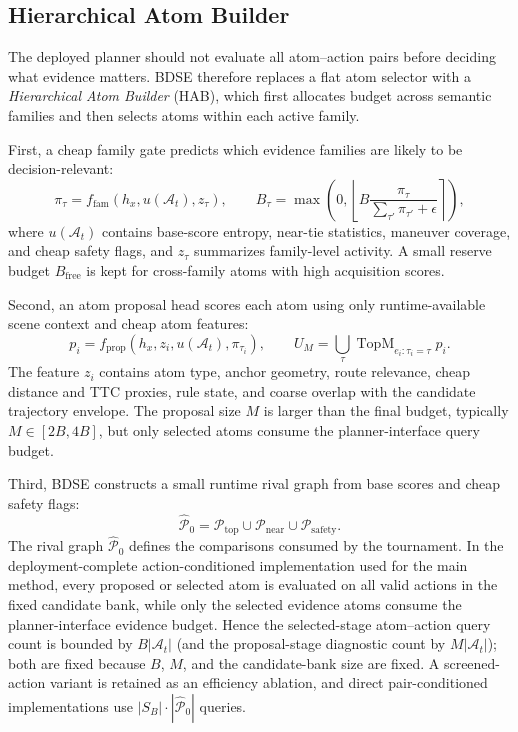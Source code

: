 \documentclass{article}
\newcommand{\A}{\mathcal{A}}
\begin{document}
\subsection{Hierarchical Atom Builder}
\label{sec:hierarchical_atom_builder}

The deployed planner should not evaluate all atom--action pairs before deciding what evidence matters. BDSE therefore replaces a flat atom selector with a \emph{Hierarchical Atom Builder} (HAB), which first allocates budget across semantic families and then selects atoms within each active family.

First, a cheap family gate predicts which evidence families are likely to be decision-relevant:
\begin{equation}
    \pi_\tau=f_{\mathrm{fam}}(h_x,u(\A_t),z_\tau),\qquad
    B_\tau=\max\!\left(0,\left\lfloor B\frac{\pi_\tau}{\sum_{\tau'}\pi_{\tau'}+\epsilon}\right\rceil\right),
    \label{eq:family_budget}
\end{equation}
where $u(\A_t)$ contains base-score entropy, near-tie statistics, maneuver coverage, and cheap safety flags, and $z_\tau$ summarizes family-level activity. A small reserve budget $B_{\mathrm{free}}$ is kept for cross-family atoms with high acquisition scores.

Second, an atom proposal head scores each atom using only runtime-available scene context and cheap atom features:
\begin{equation}
    p_i=f_{\mathrm{prop}}\!\left(h_x,z_i,u(\A_t),\pi_{\tau_i}\right),\qquad
    U_M=\bigcup_\tau \operatorname{TopM}_{e_i:\tau_i=\tau}p_i .
    \label{eq:proposal_head}
\end{equation}
The feature $z_i$ contains atom type, anchor geometry, route relevance, cheap distance and TTC proxies, rule state, and coarse overlap with the candidate trajectory envelope. The proposal size $M$ is larger than the final budget, typically $M\in[2B,4B]$, but only selected atoms consume the planner-interface query budget.

Third, BDSE constructs a small runtime rival graph from base scores and cheap safety flags:
\begin{equation}
    \widehat{\mathcal P}_0
    =
    \mathcal P_{\mathrm{top}}
    \cup \mathcal P_{\mathrm{near}}
    \cup \mathcal P_{\mathrm{safety}} .
    \label{eq:runtime_pair_screen}
\end{equation}
The rival graph $\widehat{\mathcal P}_0$ defines the comparisons consumed by the tournament. In the deployment-complete action-conditioned implementation used for the main method, every proposed or selected atom is evaluated on all valid actions in the fixed candidate bank, while only the selected evidence atoms consume the planner-interface evidence budget. Hence the selected-stage atom--action query count is bounded by $B|\A_t|$ (and the proposal-stage diagnostic count by $M|\A_t|$); both are fixed because $B$, $M$, and the candidate-bank size are fixed. A screened-action variant is retained as an efficiency ablation, and direct pair-conditioned implementations use $|S_B|\cdot |\widehat{\mathcal P}_0|$ queries.
\end{document}
